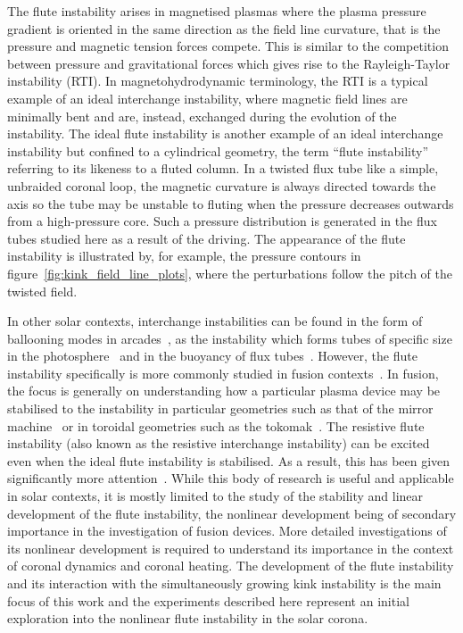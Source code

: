 \documentclass[fleqn,usenatbib]{mnras}
\begin{document}
The flute instability arises in magnetised plasmas where
the plasma pressure gradient is oriented in the same direction as the
field line curvature, that is the pressure and magnetic tension forces
compete. This is similar to the competition between pressure and
gravitational forces which gives rise to the Rayleigh-Taylor
instability (RTI). In magnetohydrodynamic terminology, the RTI is a typical example of an ideal
interchange instability, where magnetic field lines are minimally bent
and are, instead, exchanged during the evolution of the
instability. The ideal flute instability is another example of an
ideal interchange instability but confined to a cylindrical geometry,
the term ``flute instability'' referring to its likeness to a fluted
column. In a twisted flux tube like a simple, unbraided coronal loop,
the magnetic curvature is always directed towards the axis so the tube
may be unstable to fluting when the pressure decreases outwards from a
high-pressure core. Such a pressure distribution is generated in the
flux tubes studied here as a result of the driving. The appearance of
the flute instability is illustrated by, for example, the pressure
contours in figure~\ref{fig:kink_field_line_plots}, where the
perturbations follow the pitch of the twisted field. 

In other solar contexts, interchange instabilities can be found in the
form of ballooning modes in
arcades~\citep{hoodBallooningInstabilitiesSolar1986}, as the
instability which forms tubes of specific size in the
photosphere~\citep{bunteInterchangeInstabilitySolar1993} and in the
buoyancy of flux
tubes~\citep{schuesslerInterchangeInstabilitySmall1984}. However, the
flute instability specifically is more commonly studied in fusion
contexts~\citep{mikhailovskiiInstabilitiesConfinedPlasma1998,zhengAdvancedTokamakStability2015,wessonHydromagneticStabilityTokamaks1978}. In
fusion, the focus is generally on understanding how a particular
plasma device may be stabilised to the instability in particular
geometries such as that of the mirror
machine~\citep{jungwirthTheoryFluteInstability1965} or in toroidal
geometries such as the
tokomak~\citep{shafranovFluteInstabilityCurrentcarrying1968}. The
resistive flute instability (also known as the resistive interchange
instability) can be excited even when the ideal flute instability is
stabilised. As a result, this has been given significantly more
attention~\citet{johnsonResistiveInterchangesNegativeV1967,correa-restrepoResistiveBallooningModes1983}. While
this body of research is useful and applicable in solar contexts, it
is mostly limited to the study of the stability and linear development
of the flute instability, the nonlinear development being of
secondary importance in the investigation of fusion devices. More
detailed investigations of its nonlinear development is required to
understand its importance in the context of coronal dynamics and
coronal heating. The development of the flute instability and its
interaction with the simultaneously growing kink instability is the
main focus of this work and the experiments described here represent an
initial exploration into the nonlinear flute instability in the
solar corona.
\end{document}
